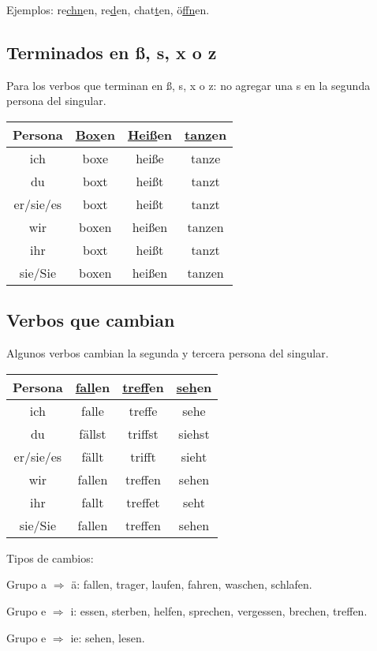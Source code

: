 Ejemplos: re\underline{chn}en, re\underline{d}en, chat\underline{t}en, ö\underline{ffn}en.

\subsection{Terminados en ß, s, x o z}
Para los verbos que terminan en ß, s, x o z: no agregar una s en la segunda persona del singular.

\begin{tabular}{|c | c c c|}
\hline
\textbf{Persona} & \textbf{\underline{Box}en}  & \textbf{\underline{Heiß}en}  & \textbf{\underline{tanz}en}\\
\hline
ich &  boxe & heiße & tanze \\
du &  boxt & heißt & tanzt \\
er/sie/es  & boxt & heißt & tanzt \\
wir & boxen & heißen & tanzen \\
ihr & boxt & heißt & tanzt \\
sie/Sie & boxen & heißen & tanzen \\
\hline
\end{tabular}

\subsection{Verbos que cambian}
Algunos verbos cambian la segunda y tercera persona del singular. 

\begin{tabular}{|c | c c c|}
\hline
\textbf{Persona} & \textbf{\underline{fall}en}  & \textbf{\underline{treff}en}  & \textbf{\underline{seh}en}\\
\hline
ich & falle & treffe & sehe \\
du &  fällst & triffst & siehst \\
er/sie/es  & fällt & trifft & sieht \\
wir & fallen & treffen & sehen \\
ihr & fallt & treffet & seht \\
sie/Sie & fallen & treffen & sehen \\
\hline
\end{tabular}

Tipos de cambios:
\begin{myitemize}
\item Grupo a $\Rightarrow$ ä: fallen, trager, laufen, fahren, waschen, schlafen.
\item Grupo e $\Rightarrow$ i: essen, sterben, helfen, sprechen, vergessen, brechen, treffen.
\item Grupo e $\Rightarrow$ ie: sehen, lesen.
\end{myitemize}


